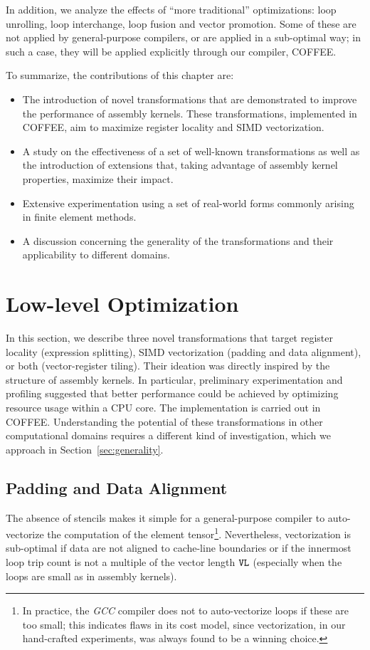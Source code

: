 In addition, we analyze the effects of ``more traditional'' optimizations: loop unrolling, loop interchange, loop fusion and vector promotion. Some of these are not applied by general-purpose compilers, or are applied in a sub-optimal way; in such a case, they will be applied explicitly through our compiler, COFFEE. 

To summarize, the contributions of this chapter are:
\begin{itemize}
\item The introduction of novel transformations that are demonstrated to improve the performance of assembly kernels. These transformations, implemented in COFFEE, aim to maximize register locality and SIMD vectorization.
\item A study on the effectiveness of a set of well-known transformations as well as the introduction of extensions that, taking advantage of assembly kernel properties, maximize their impact.
\item Extensive experimentation using a set of real-world forms commonly arising in finite element methods.
\item A discussion concerning the generality of the transformations and their applicability to different domains.
\end{itemize}

\section{Low-level Optimization}
\label{sec:lowlevelopt}

In this section, we describe three novel transformations that target register locality (expression splitting), SIMD vectorization (padding and data alignment), or both (vector-register tiling). Their ideation was directly inspired by the structure of assembly kernels. In particular, preliminary experimentation and profiling suggested that better performance could be achieved by optimizing resource usage within a CPU core. The implementation is carried out in COFFEE. Understanding the potential of these transformations in other computational domains requires a different kind of investigation, which we approach in Section~\ref{sec:generality}. 

\subsection{Padding and Data Alignment}
\label{sec:coffee-padding}
The absence of stencils makes it simple for a general-purpose compiler to auto-vectorize the computation of the element tensor\footnote{In practice, the {\em GCC} compiler does not to auto-vectorize loops if these are too small; this indicates flaws in its cost model, since vectorization, in our hand-crafted experiments, was always found to be a winning choice.}. Nevertheless, vectorization is sub-optimal if data are not aligned to cache-line boundaries or if the innermost loop trip count is not a multiple of the vector length $\mbox{\texttt{VL}}$ (especially when the loops are small as in assembly kernels). 

